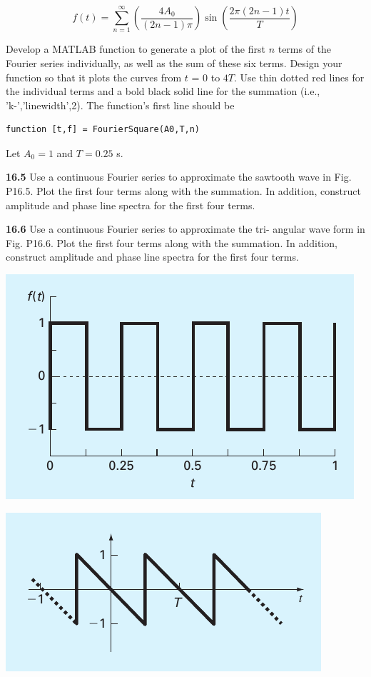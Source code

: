 \documentclass[../main.tex]{subfiles}
\begin{document}
\begin{multicols}{2}
	$$
		f(t) = \sum ^ \infty _ {n=1} (\frac{4 A_0}{(2n -1) \pi}) \sin (\frac{2 \pi (2n -1) t}{T})
	$$

	\noindent Develop a MATLAB function to generate a plot of the first $n$
	terms of the Fourier series individually, as well as the sum of
	these six terms. Design your function so that it plots the
	curves from $t$ = 0 to $4T$. Use thin dotted red lines for the individual terms and a bold black solid line for the summation
	(i.e., 'k-','linewidth',2). The function's first line
	should be

	\noindent
	\begin{lstlisting}[numbers=none]
		function [t,f] = FourierSquare(A0,T,n)
	\end{lstlisting}

	\noindent Let $A_0 = 1$ and $T = 0.25$ s.

	\noindent\textbf{16.5} Use a continuous Fourier series to approximate the
	sawtooth wave in Fig. P16.5. Plot the first four terms along
	with the summation. In addition, construct amplitude and
	phase line spectra for the first four terms.

	\noindent\textbf{16.6}  Use a continuous Fourier series to approximate the tri-
	angular wave form in Fig. P16.6. Plot the first four terms
	along with the summation. In addition, construct amplitude
	and phase line spectra for the first four terms.

	\noindent
    \begin{minipage}{\linewidth}
        \centering
        \includegraphics[width=0.8\linewidth]{./images/problem_16_4}
    \end{minipage}

	\noindent
    \begin{minipage}{\linewidth}
        \centering
        \includegraphics[width=0.8\linewidth]{./images/problem_16_5}
    \end{minipage}


\end{multicols}
\end{document}
